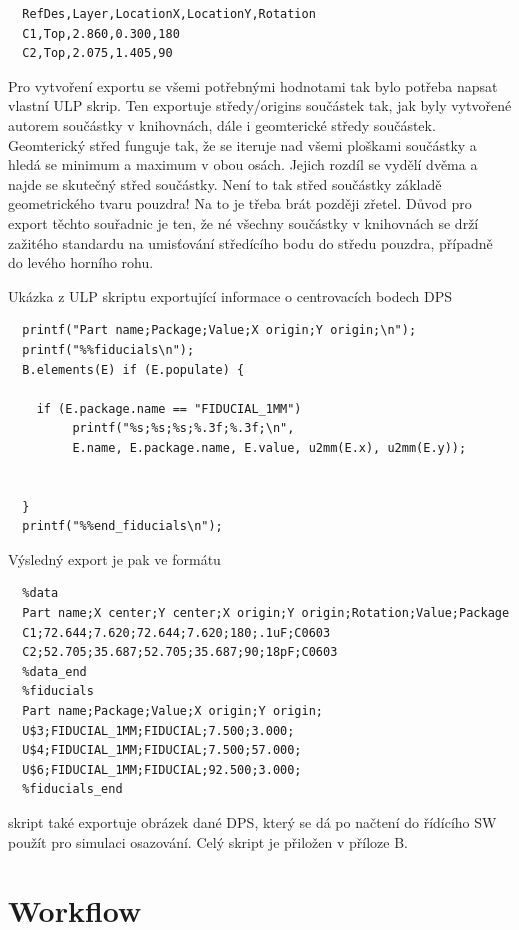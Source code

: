\begin{verbatim}
  RefDes,Layer,LocationX,LocationY,Rotation
  C1,Top,2.860,0.300,180
  C2,Top,2.075,1.405,90
\end{verbatim}

Pro vytvoření exportu se všemi potřebnými hodnotami tak bylo potřeba napsat vlastní ULP skrip. 
Ten exportuje středy/origins součástek tak, jak byly vytvořené autorem součástky v knihovnách, dále i geomterické středy součástek. Geomterický střed funguje tak, že se iteruje nad všemi ploškami součástky a hledá se minimum a maximum v obou osách. Jejich rozdíl se vydělí dvěma a najde se skutečný střed součástky. Není to tak střed součástky základě geometrického tvaru pouzdra! Na to je třeba brát později zřetel. Důvod pro export těchto souřadnic je ten, že né všechny součástky v knihovnách se drží zažitého standardu na umisťování středícího bodu do středu pouzdra, případně do levého horního rohu.

Ukázka z ULP skriptu exportující informace o centrovacích bodech DPS

\begin{verbatim}
  printf("Part name;Package;Value;X origin;Y origin;\n");
  printf("%%fiducials\n");
  B.elements(E) if (E.populate) {

    if (E.package.name == "FIDUCIAL_1MM") 
         printf("%s;%s;%s;%.3f;%.3f;\n",
         E.name, E.package.name, E.value, u2mm(E.x), u2mm(E.y));  


  }
  printf("%%end_fiducials\n");
\end{verbatim}

Výsledný export je pak ve formátu 
\begin{verbatim}
  %data
  Part name;X center;Y center;X origin;Y origin;Rotation;Value;Package
  C1;72.644;7.620;72.644;7.620;180;.1uF;C0603
  C2;52.705;35.687;52.705;35.687;90;18pF;C0603
  %data_end
  %fiducials
  Part name;Package;Value;X origin;Y origin;
  U$3;FIDUCIAL_1MM;FIDUCIAL;7.500;3.000;
  U$4;FIDUCIAL_1MM;FIDUCIAL;7.500;57.000;
  U$6;FIDUCIAL_1MM;FIDUCIAL;92.500;3.000;
  %fiducials_end
\end{verbatim}

skript také exportuje obrázek dané DPS, který se dá po načtení do řídícího SW použít pro simulaci osazování. Celý skript je přiložen v příloze B.



\section{Workflow}

